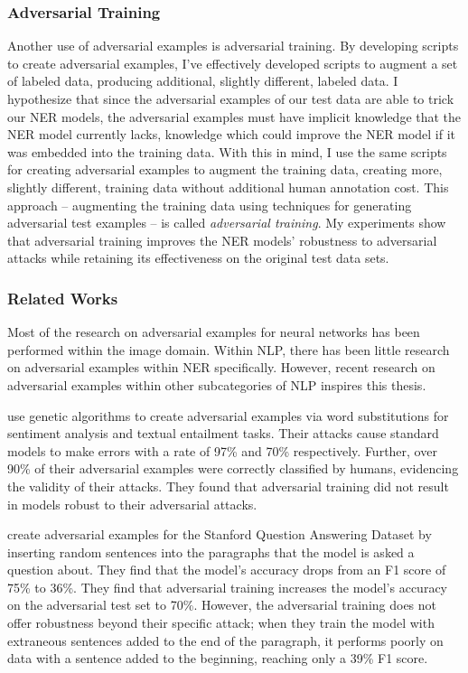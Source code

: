 \subsubsection{Adversarial Training}
Another use of adversarial examples is adversarial training. By developing scripts to create adversarial examples, I've effectively developed scripts to augment a set of labeled data, producing additional, slightly different, labeled data. I hypothesize that since the adversarial examples of our test data are able to trick our NER models, the adversarial examples must have implicit knowledge that the NER model currently lacks, knowledge which could improve the NER model if it was embedded into the training data. With this in mind, I use the same scripts for creating adversarial examples to augment the training data, creating more, slightly different, training data without additional human annotation cost. This approach --  augmenting the training data using techniques for generating adversarial test examples -- is called \textit{adversarial training}.
My experiments show that adversarial training improves the NER models' robustness to adversarial attacks while retaining its effectiveness on the original test data sets. 


\subsubsection{Related Works}
Most of the research on adversarial examples for neural networks has been performed within the image domain. Within NLP, there has been little research on adversarial examples within NER specifically. However, recent research on adversarial examples within other subcategories of NLP inspires this thesis.

\cite{alzantotAdver} use genetic algorithms to create adversarial examples via word substitutions for sentiment analysis and textual entailment tasks. Their attacks cause standard  models to make errors with a rate of 97\% and 70\% respectively. Further, over 90\% of their adversarial examples were correctly classified by humans, evidencing the validity of their attacks. They found that adversarial training did not result in models robust to their adversarial attacks.

\cite{jiaadver} create adversarial examples for the Stanford Question Answering Dataset by inserting random sentences into the paragraphs that the model is asked a question about. They find that the model's accuracy drops from an F1 score of 75\% to 36\%. They find that adversarial training increases the model's accuracy on the adversarial test set to 70\%. However, the adversarial training does not offer robustness beyond  their specific attack; when they train the model with extraneous sentences added to the end of the paragraph, it performs poorly on data with a sentence added to the beginning, reaching only a 39\% F1 score.

